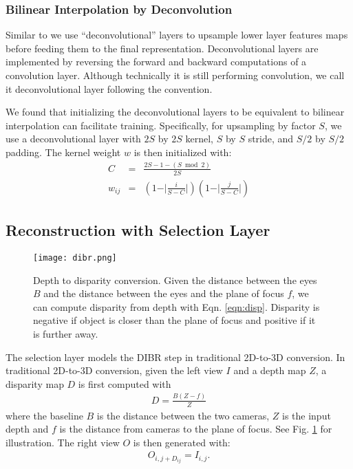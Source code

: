 \documentclass[runningheads]{llncs}
\begin{document}
\subsubsection{Bilinear Interpolation by Deconvolution}
Similar to \cite{fischer2015flownet} we use ``deconvolutional'' layers to upsample lower layer features maps before feeding them to the final representation.
Deconvolutional layers are implemented by reversing the forward and backward computations of a convolution layer.
Although technically it is still performing convolution, we call it deconvolutional layer following the convention.

We found that initializing the deconvolutional layers to be equivalent to bilinear interpolation can facilitate training.
Specifically, for upsampling by factor $S$, we use a deconvolutional layer with $2S$ by $2S$ kernel, $S$ by $S$ stride, and $S/2$ by $S/2$ padding. The kernel weight $w$ is then initialized with:
\begin{eqnarray}
C &=& \frac{2S - 1 - (S \bmod 2)}{2S}\\
w_{ij} &=& (1 - \vert \frac{i}{S-C}\vert)(1 - \vert \frac{j}{S-C} \vert)
\end{eqnarray}\subsection{Reconstruction with Selection Layer}\label{sec:dibr}\begin{figure}[!t]
\centering
\texttt{[image: dibr.png]}
\vspace{-0.6in}
\caption{Depth to disparity conversion. Given the distance between the eyes $B$ and the distance between the eyes and the plane of focus $f$, we can compute disparity from depth with Eqn. \ref{eqn:disp}. Disparity is negative if object is closer than the plane of focus and positive if it is further away.}
\label{fig:dibr}
\end{figure}
The selection layer models the DIBR step in traditional 2D-to-3D conversion.
In traditional 2D-to-3D conversion, given the left view $I$ and a depth map $Z$, a disparity map $D$ is first computed with
\begin{eqnarray}
D = \frac{B(Z-f)}{Z}
\label{eqn:disp}
\end{eqnarray}
where the baseline $B$ is the distance between the two cameras, $Z$ is the input depth and $f$ is the distance from cameras to the plane of focus. See Fig. \ref{fig:dibr} for illustration.
The right view $O$ is then generated with:
\begin{eqnarray}
O_{i, j+D_{ij}} = I_{i,j}.
\end{eqnarray}
\end{document}
